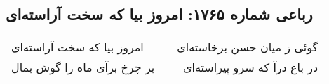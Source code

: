 \begin{center}
\section*{رباعی شماره ۱۷۶۵: امروز بیا که سخت آراسته‌ای}
\label{sec:1765}
\begin{longtable}{l p{0.5cm} r}
امروز بیا که سخت آراسته‌ای
&&
گوئی ز میان حسن برخاسته‌ای
\\
بر چرخ برآی ماه را گوش بمال
&&
در باغ درآ که سرو پیراسته‌ای
\\
\end{longtable}
\end{center}
